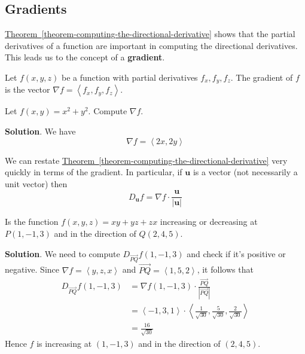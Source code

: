 \documentclass[10pt,]{book}
\newcommand{\terminology}[1]{\textbf{#1}}
\theoremstyle{ptxplainnotitle}
\theoremstyle{ptxplaintitle}
\theoremstyle{ptxplainnotitle}
\theoremstyle{ptxplaintitle}
\theoremstyle{ptxplainnotitle}
\theoremstyle{ptxplaintitle}
\theoremstyle{ptxdefinitionnotitle}
\theoremstyle{ptxdefinitiontitle}
\theoremstyle{ptxdefinitionnotitle}
\theoremstyle{ptxdefinitiontitle}
\theoremstyle{ptxdefinitionnotitle}
\theoremstyle{ptxdefinitiontitle}
\theoremstyle{ptxdefinitionnotitle}
\theoremstyle{ptxdefinitiontitle}
\theoremstyle{ptxdefinitionnotitle}
\theoremstyle{ptxdefinitiontitle}
\numberwithin{equation}{section}
\newcommand{\vv}[1]{\mathbf{#1}}
\newcommand{\grad}{\nabla}
\newcommand{\dotprod}[1]{\left\langle #1 \right\rangle}
\begin{document}
\subsection[{Gradients}]{Gradients}\label{subsection-gradients}
\hypertarget{p-1061}{}%
\hyperref[theorem-computing-the-directional-derivative]{Theorem~\ref{theorem-computing-the-directional-derivative}} shows that the partial derivatives of a function are important in computing the directional derivatives. This leads us to the concept of a \terminology{gradient}.%
\begin{definition}\label{definition-gradient-of-a-function}
\hypertarget{p-1062}{}%
Let \(f(x,y,z)\) be a function with partial derivatives \(f_{x}, f_{y}, f_{z}\). The gradient of \(f\) is the vector \(\grad f = \dotprod{f_{x}, f_{y}, f_{z}}\).%
\end{definition}
\begin{example}\label{example-computing-a-gradient}
\hypertarget{p-1063}{}%
Let \(f(x,y) = x^{2} + y^{2}\). Compute \(\grad f\).%
\par\smallskip%
\noindent\textbf{Solution}.\hypertarget{solution-166}{}\quad%
\hypertarget{p-1064}{}%
We have%
\begin{equation*}
\grad f = \dotprod{2x, 2y}
\end{equation*}
%
\end{example}
\hypertarget{p-1065}{}%
We can restate \hyperref[theorem-computing-the-directional-derivative]{Theorem~\ref{theorem-computing-the-directional-derivative}} very quickly in terms of the gradient. In particular, if \(\vv{u}\) is a vector (not necessarily a unit vector) then%
\begin{equation}
D_{\vv{u}}f = \grad f\cdot \frac{\vv{u}}{|\vv{u}|}\label{equation-directional-derivative-gradient}
\end{equation}
%
\begin{example}\label{example-directional-derivative-using-the-gradient}
\hypertarget{p-1066}{}%
Is the function \(f(x,y,z) = xy + yz + zx\) increasing or decreasing at \(P(1,-1,3)\) and in the direction of \(Q(2,4,5)\).%
\par\smallskip%
\noindent\textbf{Solution}.\hypertarget{solution-167}{}\quad%
\hypertarget{p-1067}{}%
We need to compute \(D_{\vec{PQ}}f(1,-1,3)\) and check if it's positive or negative. Since \(\grad f = \dotprod{y, z, x}\) and \(\vec{PQ} = \dotprod{1,5,2}\), it follows that%
\begin{align*}
D_{\vec{PQ}}f(1,-1,3) & = \grad f (1,-1,3)\cdot\frac{\vec{PQ}}{|\vec{PQ}|} \\
& = \dotprod{-1, 3, 1}\cdot\dotprod{\frac{1}{\sqrt{30}}, \frac{5}{\sqrt{30}}, \frac{2}{\sqrt{30}}} \\
& = \frac{16}{\sqrt{30}} 
\end{align*}
Hence \(f\) is increasing at \((1,-1,3)\) and in the direction of \((2,4,5)\).%
\end{example}
\end{document}

